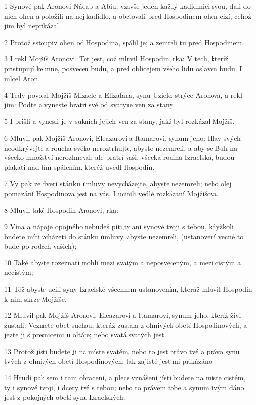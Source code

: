 \par 1 Synové pak Aronovi Nádab a Abiu, vzavše jeden každý kadidlnici svou, dali do nich ohen a položili na nej kadidlo, a obetovali pred Hospodinem ohen cizí, cehož jim byl neprikázal.
\par 2 Protož sstoupiv ohen od Hospodina, spálil je; a zemreli tu pred Hospodinem.
\par 3 I rekl Mojžíš Aronovi: Tot jest, což mluvil Hospodin, rka: V tech, kteríž pristupují ke mne, posvecen budu, a pred oblícejem všeho lidu oslaven budu. I mlcel Aron.
\par 4 Tedy povolal Mojžíš Mizaele a Elizafana, synu Uziele, strýce Aronova, a rekl jim: Podte a vyneste bratrí své od svatyne ven za stany.
\par 5 I prišli a vynesli je v sukních jejich ven za stany, jakž byl rozkázal Mojžíš.
\par 6 Mluvil pak Mojžíš Aronovi, Eleazarovi a Itamarovi, synum jeho: Hlav svých neodkrývejte a roucha svého neroztrhujte, abyste nezemreli, a aby se Buh na všecko množství nerozhneval; ale bratrí vaši, všecka rodina Izraelská, budou plakati nad tím spálením, kteréž uvedl Hospodin.
\par 7 Vy pak ze dverí stánku úmluvy nevycházejte, abyste nezemreli; nebo olej pomazání Hospodinova jest na vás. I ucinili vedlé rozkázaní Mojžíšova.
\par 8 Mluvil také Hospodin Aronovi, rka:
\par 9 Vína a nápoje opojného nebudeš píti,ty ani synové tvoji s tebou, kdyžkoli budete míti vcházeti do stánku úmluvy, abyste nezemreli, (ustanovení vecné to bude po rodech vašich);
\par 10 Také abyste rozeznati mohli mezi svatým a neposveceným, a mezi cistým a necistým;
\par 11 Též abyste ucili syny Izraelské všechnem ustanovením, kteráž mluvil Hospodin k nim skrze Mojžíše.
\par 12 Mluvil pak Mojžíš Aronovi, Eleazarovi a Itamarovi, synum jeho, kteríž živi zustali: Vezmete obet suchou, kteráž zustala z ohnivých obetí Hospodinových, a jezte ji s presnicemi u oltáre; nebo svatá svatých jest.
\par 13 Protož jísti budete ji na míste svatém, nebo to jest právo tvé a právo synu tvých z ohnivých obetí Hospodinových; tak zajisté jest mi prikázáno.
\par 14 Hrudí pak sem i tam obracení, a plece vznášení jísti budete na míste cistém, ty i synové tvoji, i dcery tvé s tebou; nebo to právem tobe a synum tvým dáno jest z pokojných obetí synu Izraelských.
